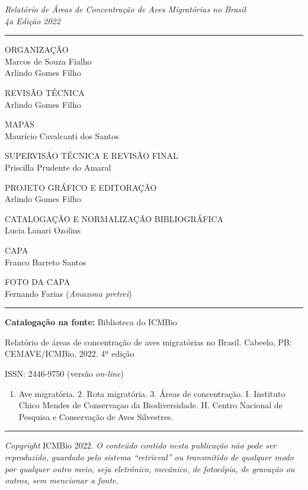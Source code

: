 \documentclass[
  oneside]{scrbook}
\providecommand{\tightlist}{%
  \setlength{\itemsep}{0pt}\setlength{\parskip}{0pt}}
\begin{document}
\emph{Relatório de Áreas de Concentração de Aves Migratórias no Brasil}\\
\emph{4a Edição \textbar{} 2022}

\begin{center}\rule{0.5\linewidth}{0.5pt}\end{center}

ORGANIZAÇÃO\\
Marcos de Souza Fialho\\
Arlindo Gomes Filho~

REVISÃO TÉCNICA\\
Arlindo Gomes Filho~

MAPAS\\
Maurício Cavalcanti dos Santos~

SUPERVISÃO TÉCNICA E REVISÃO FINAL\\
Priscilla Prudente do Amaral~

PROJETO GRÁFICO E EDITORAÇÃO\\
Arlindo Gomes Filho~

CATALOGAÇÃO E NORMALIZAÇÃO BIBLIOGRÁFICA\\
Lucia Lanari Ozolins~

CAPA\\
Franco Barreto Santos~

FOTO DA CAPA\\
Fernando Farias (\emph{Amazona pretrei})~

\begin{center}\rule{0.5\linewidth}{0.5pt}\end{center}

\textbf{Catalogação na fonte:} Biblioteca do ICMBio

Relatório de áreas de concentração de aves migratórias no Brasil. Cabeelo, PB: CEMAVE/ICMBio. 2022. 4ª edição

ISSN: 2446-9750 (versão \emph{on-line})

\begin{enumerate}
\def\labelenumi{\arabic{enumi}.}
\tightlist
\item
  Ave migratória. 2. Rota migratória. 3. Áreas de concentração. I. Instituto Chico Mendes de Conservaçao da Biodiversidade. II. Centro Nacional de Pesquisa e Conservação de Aves Silvestres.
\end{enumerate}

\begin{center}\rule{0.5\linewidth}{0.5pt}\end{center}

\emph{Copyright} ICMBio 2022. \emph{O conteúdo contido nesta publicação não pode ser reproduzido, guardado pelo sistema ``retrieval'' ou transmitido de qualquer modo por qualquer outro meio, seja eletrônico, mecânico, de fotocópia, de gravação ou outros, sem mencionar a fonte.}
\end{document}
